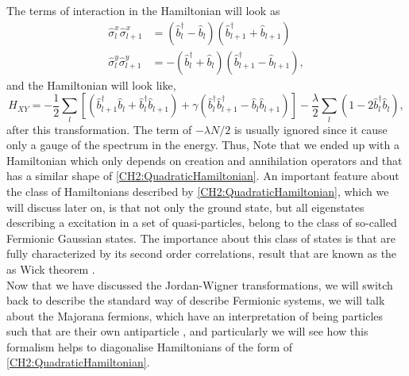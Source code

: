 The terms of interaction in the Hamiltonian will look as
\begin{equation}
\begin{aligned}
\hat{\sigma}_{l}^{x} \hat{\sigma}_{l+1}^{x} &=\left(\hat{b}_{l}^{\dagger}-\hat{b}_{l}\right)\left(\hat{b}_{l+1}^{\dagger}+\hat{b}_{l+1}\right) \\
\hat{\sigma}_{l}^{y} \hat{\sigma}_{l+1}^{y} &=-\left(\hat{b}_{l}^{\dagger}+\hat{b}_{l}\right)\left(\hat{b}_{l+1}^{\dagger}-\hat{b}_{l+1}\right),
\end{aligned}
\end{equation}
and the Hamiltonian will look like,
\begin{equation}
H_{X Y}=-\frac{1}{2} \sum_{l}\left[\left(\hat{b}_{l+1}^{\dagger} \hat{b}_{l}+\hat{b}_{l}^{\dagger} \hat{b}_{l+1}\right)+\gamma\left(\hat{b}_{l}^{\dagger} \hat{b}_{l+1}^{\dagger}-\hat{b}_{l} \hat{b}_{l+1}\right)\right]-\frac{\lambda}{2} \sum_{l}\left(1-2 \hat{b}_{l}^{\dagger} \hat{b}_{l}\right),
\end{equation}
after this transformation. The term of $-\lambda N/2$ is usually ignored since it cause only a gauge of the spectrum in the energy\cite{reyes-lega_aspects_2016}. Thus, Note that we ended up with a Hamiltonian which only depends on creation and annihilation operators and that has a similar shape of \eqref{CH2:QuadraticHamiltonian}.  An important feature about the class of Hamiltonians described by \eqref{CH2:QuadraticHamiltonian}, which we will discuss later on,  is that not only the ground state,  but all eigenstates describing a excitation in a set of quasi-particles, belong to the class of so-called Fermionic Gaussian states\cite{botero_bcs-like_2004}. The importance about this class of states is that are fully characterized by its second order correlations, result that are known as the as Wick theorem \cite{westwanski_general_1973,molinari_notes_2017}.\\

Now that we have discussed the Jordan-Wigner transformations, we will switch back to describe the standard way of describe Fermionic systems, we will talk about the Majorana fermions, which have an interpretation of being particles such that are their own antiparticle \cite{leijnse_introduction_2012}, and particularly we will see how this formalism helps to diagonalise Hamiltonians of the form of \eqref{CH2:QuadraticHamiltonian}.



